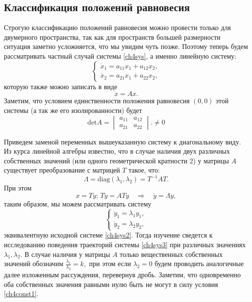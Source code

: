 \subsection{Классификация положений равновесия}
Строгую классификацию положений равновесия можно провести только для двумерного пространства, так как для пространств большей размерности ситуация заметно усложняется, что мы увидим чуть позже. Поэтому теперь будем рассматривать частный случай системы \eqref{ch4sys}, а именно линейную систему:
\begin{equation}
\begin{cases}
\dot x_1 = a_{11}x_1 + a_{12}x_2, \\
\dot x_2 = a_{21}x_1 + a_{22}x_2,
\end{cases}
\end{equation}
которую также можно записать в виде 
\begin{equation} \label{ch4sys2}
\dot x = A x.
\end{equation}
Заметим, что условием единственности положения равновесия $(0,0)$ этой системы (а так же его изолированности) будет
\begin{equation} \label{ch4const1}
\text{det} A = \begin{vmatrix}
a_{11} & a_{12} \\
a_{21} & a_{22} 
\end{vmatrix}. \neq 0
\end{equation}

Приведем заменой переменных вышеуказанную систему к диагональному виду. Из курса линейной алгебры известно, что в случае наличия двух различных собственных значений (или одного геометрической кратности 2) у матрицы $A$ существует преобразование с матрицей $T$ такое, что:
$$
\Lambda = \text{diag} (\lambda_1, \lambda_2) = T^{-1} A T.
$$
При этом 
$$
x = Ty; \, T \dot y = A T y \quad \Rightarrow \quad \dot y = \Lambda y,
$$
таким образом, мы можем рассматривать систему 
\begin{equation} \label{ch4sys3}
\begin{cases}
\dot y_1 = \lambda_1 y_1 , \\
\dot y_2 = \lambda_2 y_2,
\end{cases}
\end{equation}
эквивалентную исходной системе \eqref{ch4sys2}. Тогда изучение сведется к исследованию поведения траекторий системы \eqref{ch4sys3} при различных значениях $\lambda_1, \lambda_2.$ В случае наличия у матрицы $A$ только вещественных собственных значений обозначим $ \frac{\lambda_1 }{ \lambda_2} = k,$ при этом если  $\lambda_2= 0$ будем проводить аналогичные далее изложенным рассуждения, перевернув дробь. Заметим, что одновременно оба собственных значения равными нулю быть не могут в силу условия \eqref{ch4const1}.

